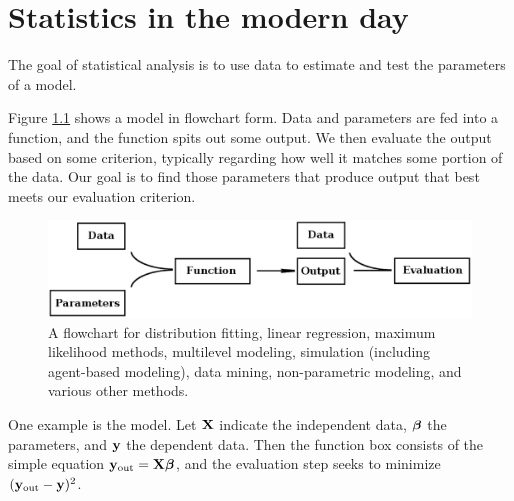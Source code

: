 \chapter[Introduction]{Statistics in the modern day}\label{intro}



The goal of statistical analysis is to use data to estimate and test
the parameters of a model.

Figure \ref{modelflow} shows a model in flowchart form.  Data and
parameters are fed into a function, and the function spits out some
output. We then evaluate the output based on some criterion, typically
regarding how well it matches some portion of the data. Our
goal is to find those parameters that produce output that best meets
our evaluation criterion.


\begin{figure}[htb]
\begin{center}
\includegraphics[width=\textwidth*\real{1.05}]{models}
\end{center}
\caption{A flowchart for distribution fitting, linear regression,
maximum likelihood methods, multilevel modeling,
simulation (including agent-based modeling), data mining, non-parametric modeling,
and various other methods.}
\label{modelflow}
\end{figure}

One example is the  model. Let ${\bf X}$
indicate the independent data, ${\mbox{\boldmath$\beta$}}$ the parameters, and ${\bf y}$ the
dependent data. Then the function box consists of the simple equation
${\bf y}_{\rm out} = {\bf X}{\mbox{\boldmath$\beta$}}$, and the evaluation step seeks to minimize
$({\bf y}_{\rm out} - {\bf y})^2$. 


